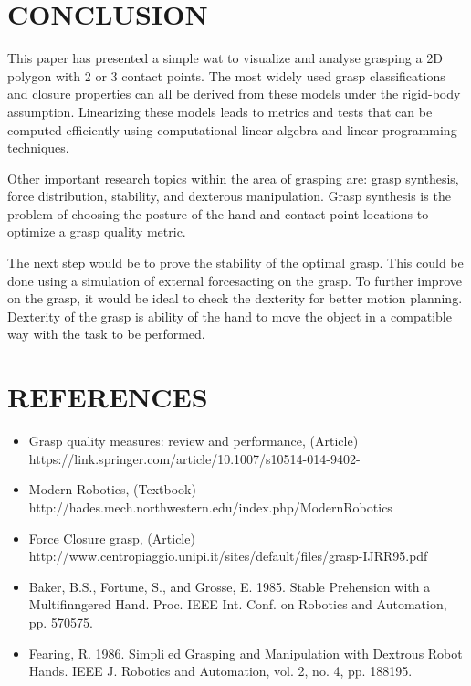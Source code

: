 \documentclass[letterpaper, 10 pt, conference]{ieeeconf}
\begin{document}
    \section{CONCLUSION}
    This paper has presented a simple wat to visualize and analyse grasping a 2D polygon with 2 or 3 contact points. The most widely used grasp classifications and closure properties can all be derived from these models under the rigid-body assumption. Linearizing these models leads to metrics and tests that can be computed efficiently using computational linear algebra and linear programming techniques.
    
    Other important research topics within the area of grasping are: grasp synthesis, force distribution, stability, and dexterous manipulation. Grasp synthesis is the problem of choosing the posture of the hand and contact point locations to optimize a grasp quality metric.
    
    The next step would be to prove the stability of the optimal grasp. This could be done using a simulation of external forcesacting on the grasp. To further improve on the grasp, it would be ideal to check the dexterity for better motion planning. Dexterity of the grasp is ability of the hand to move the object in a compatible way with the task to be performed. 
    
    
    \section{REFERENCES}
    
    \begin{itemize}
        \item Grasp quality measures: review and performance, (Article) https://link.springer.com/article/10.1007/s10514-014-9402-
        \item Modern Robotics, (Textbook) http://hades.mech.northwestern.edu/index.php/ModernRobotics
        \item Force Closure grasp, (Article) http://www.centropiaggio.unipi.it/sites/default/files/grasp-IJRR95.pdf
        \item Baker, B.S., Fortune, S., and Grosse, E. 1985. Stable Prehension with a Multifinngered Hand. Proc. IEEE Int. Conf. on Robotics and Automation, pp. 570{575.}
        \item Fearing, R. 1986. Simplied Grasping and Manipulation with Dextrous Robot Hands. IEEE J. Robotics and Automation, vol. 2, no. 4, pp. 188{195.}
        
    \end{itemize}
    
\end{document}
